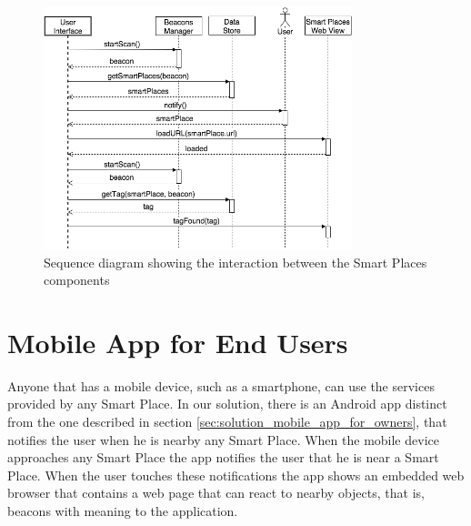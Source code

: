 \begin{figure}[!ht]
  \centering
    \includegraphics[width=0.8\textwidth, keepaspectratio]{images/client_app_sequence}
    \caption[Smart Places Sequence Diagram]{Sequence diagram showing the interaction between the Smart Places components}
    \label{fig:smart_places_sequence}
\end{figure}

\section{Mobile App for End Users}
\label{sec:solution_mobile_app_for_end_users}
Anyone that has a mobile device, such as a smartphone, can use the services provided by any Smart Place.
In our solution, there is an Android app distinct from the one described in section \ref{sec:solution_mobile_app_for_owners}, that notifies the user when he is nearby any Smart Place.
When the mobile device approaches any Smart Place the app notifies the user that he is near a Smart Place.
When the user touches these notifications the app shows an embedded web browser that contains a web page that can react to nearby objects, that is, beacons with meaning to the application.


